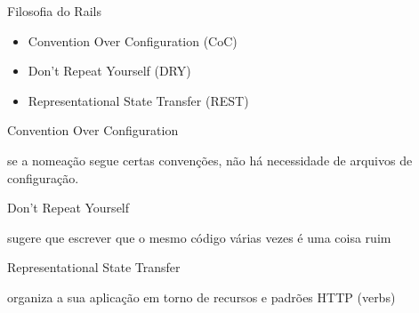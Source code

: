 \begin{frame}[fragile,t]{Filosofia do Rails}
  \begin{itemize}
    \item Convention Over Configuration (CoC)
    \item Don't Repeat Yourself (DRY)
    \item Representational State Transfer (REST)
  \end{itemize}   
\end{frame}

\begin{frame}[fragile, c]{Convention Over Configuration}
  \begin{center}
    \large se a nomeação \alert{segue} certas \alert{convenções}, não há necessidade de arquivos de \alert{configuração}.
  \end{center}   
\end{frame}

\begin{frame}[fragile, c]{Don't Repeat Yourself}
  \begin{center}
    \large sugere que escrever que o \alert{mesmo código} várias vezes é uma \alert{coisa ruim}
    \end{center}
\end{frame}

\begin{frame}[fragile,t]{Representational State Transfer}
  \begin{center}
    \item organiza a sua aplicação em torno de \alert{recursos} e \alert{padrões} HTTP (verbs)
  \end{center}   
\end{frame}